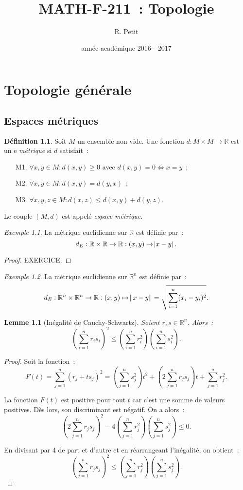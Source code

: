 \documentclass{report}
\title{MATH-F-211~: Topologie}
\author{R. Petit}
\date{année académique 2016 - 2017}
\newtheorem{lem}[thm]{Lemme}
\theoremstyle{definition}
\newtheorem{déf}[thm]{Définition}
\theoremstyle{remark}
\newtheorem{ex}{Exemple}[section]
\newcommand{\R}{\mathbb R}
\begin{document}
\maketitle
\tableofcontents
\newpage
\setcounter{page}{1}

\chapter{Topologie générale}
	\section{Espaces métriques}
		\begin{déf} Soit $M$ un ensemble non vide. Une fonction $d : M \times M \to \R$ est un e \textit{métrique} si $d$ satisfait~:
		\begin{itemize}
			\item[M1.] $\forall x, y \in M : d(x, y) \geq 0$ avec $d(x, y) = 0 \iff x = y$~;
			\item[M2.] $\forall x, y \in M : d(x, y) = d(y, x)$~;
			\item[M3.] $\forall x, y, z \in M : d(x, z) \leq d(x, y) + d(y, z)$.
		\end{itemize}

		Le couple $(M, d)$ est appelé \textit{espace métrique}.
		\end{déf}

		\begin{ex} La métrique euclidienne sur $\R$ est définie par~:
		\[d_E : \R \times \R \to \R : (x, y) \mapsto \abs {x-y}.\]
		\end{ex}

		\begin{proof} EXERCICE.
		\end{proof}

		\begin{ex}\label{ex:metriqueeuclidiennern} La métrique euclidienne sur $\R^n$ est définie par~:
		\[d_E : \R^n \times \R^n \to \R : (x, y) \mapsto \norm {x-y} = \sqrt {\sum_{i=1}^n (x_i-y_i)^2}.\]
		\end{ex}

		\begin{lem}[Inégalité de Cauchy-Schwartz] Soient $r, s \in \R^n$. Alors~:
		\[\left(\sum_{i=1}^n r_is_i\right)^2 \leq \left(\sum_{i=1}^nr_i^2\right)\left(\sum_{i=1}^ns_i^2\right).\]
		\end{lem}

		\begin{proof} Soit la fonction~:
		\[F(t) = \sum_{j=1}^n(r_j + ts_j)^2 = \left(\sum_{j=1}^ns_j^2\right)t^2 + \left(2\sum_{j=1}^nr_js_j\right)t + \sum_{j=1}^nr_j^2.\]

		La fonction $F(t)$ est positive pour tout $t$ car c'est une somme de valeurs positives. Dès lors, son discriminant est négatif. On a alors~:
		\[\left(2\sum_{j=1}^nr_js_j\right)^2 - 4\left(\sum_{j=1}^nr_j^2\right)\left(\sum_{j=1}^ns_j^2\right) \leq 0.\]

		En divisant par 4 de part et d'autre et en réarrangeant l'inégalité, on obtient~:
		\[\left(\sum_{j=1}^nr_js_j\right)^2 \leq \left(\sum_{j=1}^nr_j^2\right)\left(\sum_{j=1}^ns_j^2\right).\]
		\end{proof}
\end{document}
